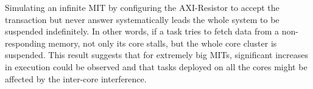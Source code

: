     Simulating an infinite MIT by configuring the AXI-Resistor to accept the transaction but never answer systematically leads the whole system to be suspended indefinitely.
    In other words, if a task tries to fetch data from a non-responding memory, not only its core stalls, but the whole core cluster is suspended.
    This result suggests that for extremely big MITs, significant increases in execution could be observed and that tasks deployed on all the cores might be affected by the inter-core interference.
